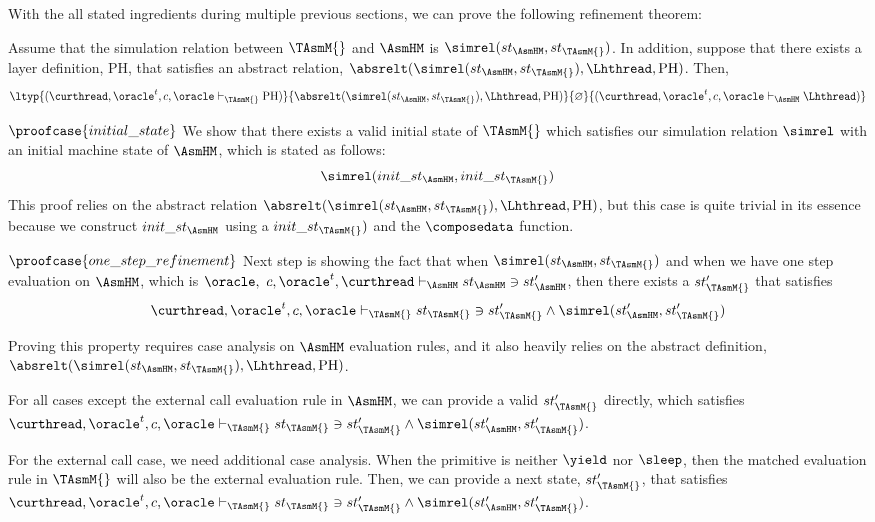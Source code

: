 With the all stated ingredients during multiple previous sections, we can prove the following refinement theorem:
\begin{theorem}
\begin{small}
Assume that the simulation relation between $\TAsmM{}$ and $\AsmHM$ is $\simrel(st_{\AsmHM}, st_{\TAsmM{}})$.
In addition, suppose that there exists a layer definition, $\mathrm{PH}$, that satisfies an abstract relation, 
$\absrelt(\simrel(st_{\AsmHM}, st_{\TAsmM{}}), \Lhthread, \mathrm{PH})$. Then,
$$\ltyp{(\curthread, \oracle^{t}, c, \oracle \vdash_{\TAsmM{}} \mathrm{PH})}
{\absrelt(\simrel(st_{\AsmHM}, st_{\TAsmM{}}), \Lhthread, \mathrm{PH})}
{\varnothing}{(\curthread, \oracle^{t}, c, \oracle \vdash_{\AsmHM} \Lhthread)}$$
\end{small}
\label{theorem:hasm-refines_tasm}
\end{theorem}%

$\proofcase{initial\_state}$ We show that there exists a valid initial state of $\TAsmM{}$ which satisfies our simulation relation
$\simrel$ with an initial machine state of $\AsmHM$, which is stated as follows:
$$\simrel(init\_st_{\AsmHM}, init\_st_{\TAsmM{}})$$
This proof relies on the abstract relation $\absrelt(\simrel(st_{\AsmHM}, st_{\TAsmM{}}), \Lhthread, \mathrm{PH})$,
but this case is quite trivial in its essence
because we construct $init\_st_{\AsmHM}$ using a $init\_st_{\TAsmM{}})$ and 
the $\composedata$ function.

$\proofcase{one\_step\_refinement}$
Next step is showing the fact that when $\simrel(st_{\AsmHM}, st_{\TAsmM{}})$ and when we have one step evaluation on $\AsmHM$, which is $\oracle, \ c, \oracle^{t}, \curthread \vdash_{\AsmHM} st_{\AsmHM} \ni st'_{\AsmHM} $, 
then there exists a $st'_{\TAsmM{}}$ that satisfies 
$$\curthread, \oracle^{t}, c, \oracle \vdash_{\TAsmM{}} st_{\TAsmM{}} \ni st'_{\TAsmM{}} \wedge \simrel(st'_{\AsmHM}, st'_{\TAsmM{}})$$

Proving this property requires case analysis on $\AsmHM$ evaluation rules, and it  
also heavily relies on the abstract definition,  $\absrelt(\simrel(st_{\AsmHM}, st_{\TAsmM{}}), \Lhthread, \mathrm{PH})$.

For all cases except the external call evaluation rule in $\AsmHM$, 
we can provide a valid $st'_{\TAsmM{}}$ directly, which satisfies $\curthread, \oracle^{t}, c, \oracle \vdash_{\TAsmM{}} st_{\TAsmM{}} \ni st'_{\TAsmM{}} \wedge \simrel(st'_{\AsmHM}, st'_{\TAsmM{}})$.

For the external call case, we need additional case analysis.
When the primitive is neither $\yield$ nor $\sleep$, then the matched
evaluation rule in $\TAsmM{}$ will also be the external evaluation rule. 
Then, we can provide a next state, $st'_{\TAsmM{}}$, that satisfies $\curthread, \oracle^{t}, c, \oracle \vdash_{\TAsmM{}} st_{\TAsmM{}} \ni st'_{\TAsmM{}} \wedge \simrel(st'_{\AsmHM}, st'_{\TAsmM{}})$.

